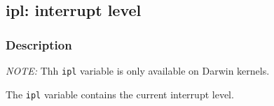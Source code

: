\clearpage
{}
{}
\label{vars:ipl}
\subsection*{ipl: interrupt level}

\subsubsection*{Description}

\emph{NOTE:} Thh \verb|ipl| variable is only available on Darwin
kernels.

The \verb|ipl| variable contains the current interrupt level.

